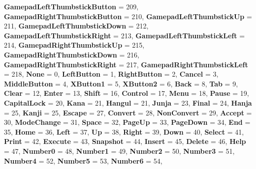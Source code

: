 \begin{DoxyCompactItemize}
\newline
{\bfseries Gamepad\+Left\+Thumbstick\+Button} = 209, 
{\bfseries Gamepad\+Right\+Thumbstick\+Button} = 210, 
{\bfseries Gamepad\+Left\+Thumbstick\+Up} = 211, 
{\bfseries Gamepad\+Left\+Thumbstick\+Down} = 212, 
\newline
{\bfseries Gamepad\+Left\+Thumbstick\+Right} = 213, 
{\bfseries Gamepad\+Left\+Thumbstick\+Left} = 214, 
{\bfseries Gamepad\+Right\+Thumbstick\+Up} = 215, 
{\bfseries Gamepad\+Right\+Thumbstick\+Down} = 216, 
\newline
{\bfseries Gamepad\+Right\+Thumbstick\+Right} = 217, 
{\bfseries Gamepad\+Right\+Thumbstick\+Left} = 218, 
{\bfseries None} = 0, 
{\bfseries Left\+Button} = 1, 
\newline
{\bfseries Right\+Button} = 2, 
{\bfseries Cancel} = 3, 
{\bfseries Middle\+Button} = 4, 
{\bfseries X\+Button1} = 5, 
\newline
{\bfseries X\+Button2} = 6, 
{\bfseries Back} = 8, 
{\bfseries Tab} = 9, 
{\bfseries Clear} = 12, 
\newline
{\bfseries Enter} = 13, 
{\bfseries Shift} = 16, 
{\bfseries Control} = 17, 
{\bfseries Menu} = 18, 
\newline
{\bfseries Pause} = 19, 
{\bfseries Capital\+Lock} = 20, 
{\bfseries Kana} = 21, 
{\bfseries Hangul} = 21, 
\newline
{\bfseries Junja} = 23, 
{\bfseries Final} = 24, 
{\bfseries Hanja} = 25, 
{\bfseries Kanji} = 25, 
\newline
{\bfseries Escape} = 27, 
{\bfseries Convert} = 28, 
{\bfseries Non\+Convert} = 29, 
{\bfseries Accept} = 30, 
\newline
{\bfseries Mode\+Change} = 31, 
{\bfseries Space} = 32, 
{\bfseries Page\+Up} = 33, 
{\bfseries Page\+Down} = 34, 
\newline
{\bfseries End} = 35, 
{\bfseries Home} = 36, 
{\bfseries Left} = 37, 
{\bfseries Up} = 38, 
\newline
{\bfseries Right} = 39, 
{\bfseries Down} = 40, 
{\bfseries Select} = 41, 
{\bfseries Print} = 42, 
\newline
{\bfseries Execute} = 43, 
{\bfseries Snapshot} = 44, 
{\bfseries Insert} = 45, 
{\bfseries Delete} = 46, 
\newline
{\bfseries Help} = 47, 
{\bfseries Number0} = 48, 
{\bfseries Number1} = 49, 
{\bfseries Number2} = 50, 
\newline
{\bfseries Number3} = 51, 
{\bfseries Number4} = 52, 
{\bfseries Number5} = 53, 
{\bfseries Number6} = 54, 
\newline

\end{DoxyCompactItemize}
